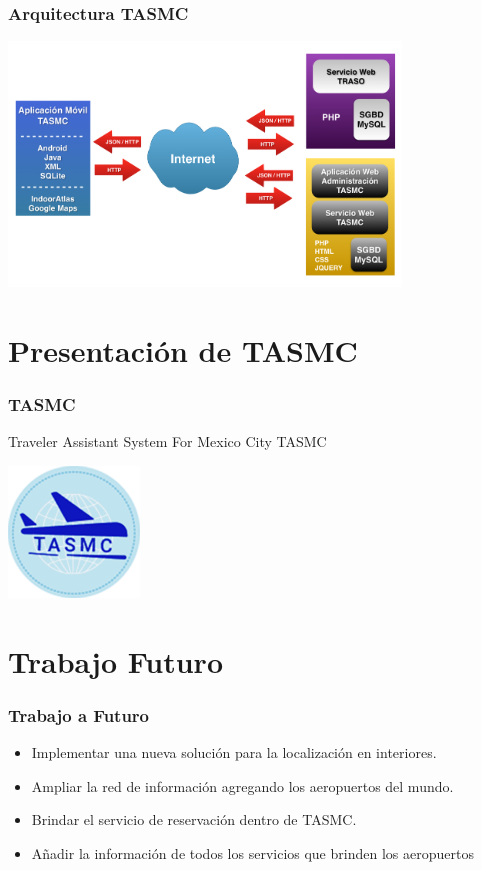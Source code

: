 \documentclass[12pt]{beamer}
\begin{document}
\begin{frame}
	\frametitle{Arquitectura TASMC}
	\begin{center}
		\includegraphics[height=6.5cm]{imagenes/arquitectura.png}	
	\end{center}
\end{frame}

\section{Presentación de TASMC}

\begin{frame}
	\frametitle{TASMC}
	\begin{center}
		\textcolor[RGB]{0,0,204}{\Large Traveler Assistant System For Mexico City TASMC}
	\end{center}	
	\begin{center}
		\includegraphics[height=3.5cm]{imagenes/logo.png}
	\end{center}	
\end{frame}  

\section{Trabajo Futuro}

\begin{frame}
	\frametitle{Trabajo a Futuro}
	\begin{block}{}
		\begin{itemize}
	\item Implementar una nueva solución para la localización en interiores.
	\item Ampliar la red de información agregando los aeropuertos del mundo.
	\item Brindar el servicio de reservación dentro de TASMC.
	\item Añadir la información de todos los servicios que brinden los aeropuertos
\end{itemize}
	\end{block}

\end{frame}  
\end{document}
